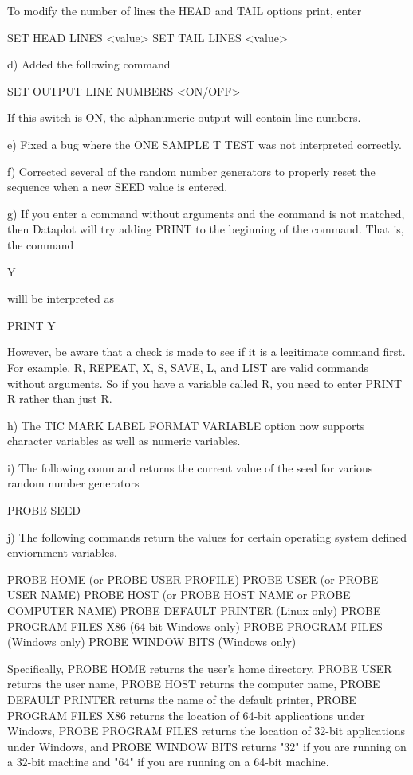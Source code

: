        To modify the number of lines the HEAD and TAIL options print,
       enter

          SET HEAD LINES <value>
          SET TAIL LINES <value>

    d) Added the following command

          SET OUTPUT LINE NUMBERS <ON/OFF>

       If this switch is ON, the alphanumeric output will
       contain line numbers.

    e) Fixed a bug where the ONE SAMPLE T TEST was not
       interpreted correctly.

    f) Corrected several of the random number generators to
       properly reset the sequence when a new SEED value is
       entered.

    g) If you enter a command without arguments and the command
       is not matched, then Dataplot will try adding  PRINT to the
       beginning of the command.  That is, the command

           Y

       willl be interpreted as 

           PRINT Y

       However, be aware that a check is made to see if it is
       a legitimate command first.  For example, R, REPEAT, X,
       S, SAVE, L, and LIST are valid commands without arguments.
       So if you have a variable called R, you need to enter
       PRINT R rather than just R.

    h) The TIC MARK LABEL FORMAT VARIABLE option now supports
       character variables as well as numeric variables.

    i) The following command returns the current value of the
       seed for various random number generators

           PROBE SEED

    j) The following commands return the values for certain
       operating system defined enviornment variables.

           PROBE HOME  (or PROBE USER PROFILE)
           PROBE USER  (or PROBE USER NAME)
           PROBE HOST  (or PROBE HOST NAME or PROBE COMPUTER NAME)
           PROBE DEFAULT PRINTER (Linux only)
           PROBE PROGRAM FILES X86 (64-bit Windows only)
           PROBE PROGRAM FILES     (Windows only)
           PROBE WINDOW BITS       (Windows only)

      Specifically, PROBE HOME returns the user's home directory,
      PROBE USER returns the user name, PROBE HOST returns the computer
      name, PROBE DEFAULT PRINTER returns the name of the default
      printer, PROBE PROGRAM FILES X86 returns the location of
      64-bit applications under Windows, PROBE PROGRAM FILES returns
      the location of 32-bit applications under Windows, and
      PROBE WINDOW BITS returns "32" if you are running on a
      32-bit machine and "64" if you are running on a 64-bit
      machine.

